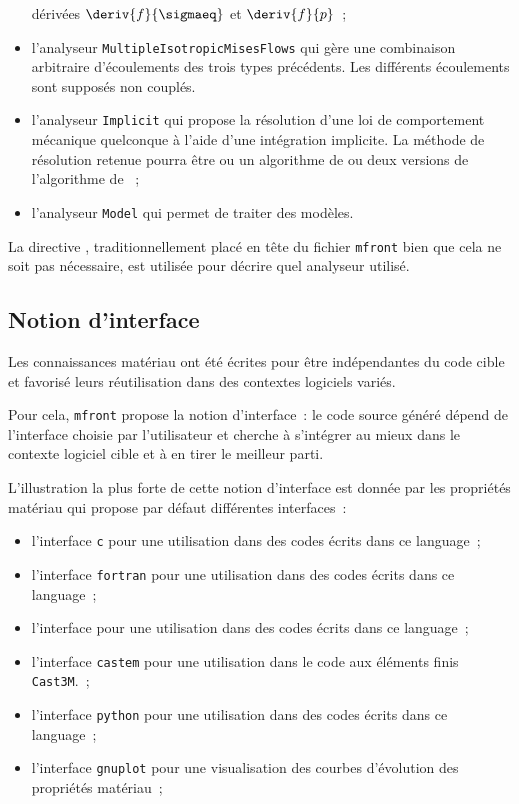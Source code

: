 \documentclass[rectoverso,pleiades,pstricks,leqno,anti]{texmf/note_technique_2010}
\makeatletter
\newcommand{\mfront}{\texttt{mfront}}
\newcommand{\castem}{\texttt{Cast3M}}
\newcommand{\mkey}[1]{\index{mkeys}{#1@\symbol{64}#1}{\texttt{@#1}}}
\def\ifmonospace{\ifdim\fontdimen3\font=0pt }
\def\cpp{%
\ifmonospace%
    C++%
\else%
    C\kern-.1667em\raise.30ex\hbox{\smaller{++}}%
\fi%
\spacefactor1000 }
\makeatother
\begin{document}
\begin{itemize}
  dérivées \(\deriv{f}{\sigmaeq}\) et \(\deriv{f}{p}\)~;
  \item l'analyseur \texttt{MultipleIsotropicMisesFlows} qui gère une
  combinaison arbitraire d'écoulements des trois types précédents. Les
  différents écoulements sont supposés non couplés.
  \item l'analyseur \texttt{Implicit} qui propose la résolution d'une
  loi de comportement mécanique quelconque à l'aide d'une intégration
  implicite. La méthode de résolution retenue pourra être ou un
  algorithme de  ou deux versions de l'algorithme de
  ~;
  \item l'analyseur \texttt{Model} qui permet de traiter des modèles.
\end{itemize}

La directive \mkey{Parser}, traditionnellement placé en tête du fichier
\mfront{} bien que cela ne soit pas nécessaire, est utilisée pour
décrire quel analyseur utilisé.

\subsection{Notion d'interface}
\label{sec:mfront:interface}

Les connaissances matériau ont été écrites pour être indépendantes du
code cible et favorisé leurs réutilisation dans des contextes logiciels
variés.

Pour cela, \mfront{} propose la notion d'interface~: le code source
généré dépend de l'interface choisie par l'utilisateur et cherche à
s'intégrer au mieux dans le contexte logiciel cible et à en tirer le
meilleur parti.

L'illustration la plus forte de cette notion d'interface est donnée par
les propriétés matériau qui propose par défaut différentes interfaces~:
\begin{itemize}
  \item l'interface \texttt{c} pour une utilisation dans des codes
  écrits dans ce language~;
  \item l'interface \texttt{fortran} pour une utilisation dans des codes
  écrits dans ce language~;
  \item l'interface \cpp{} pour une utilisation dans des codes
  écrits dans ce language~;
  \item l'interface \texttt{castem} pour une utilisation dans le code
  aux éléments finis \castem{}.~;
  \item l'interface \texttt{python} pour une utilisation dans des codes
  écrits dans ce language~;
  \item l'interface \texttt{gnuplot} pour une visualisation des courbes
  d'évolution des propriétés matériau~;
\end{itemize}
\end{document}
